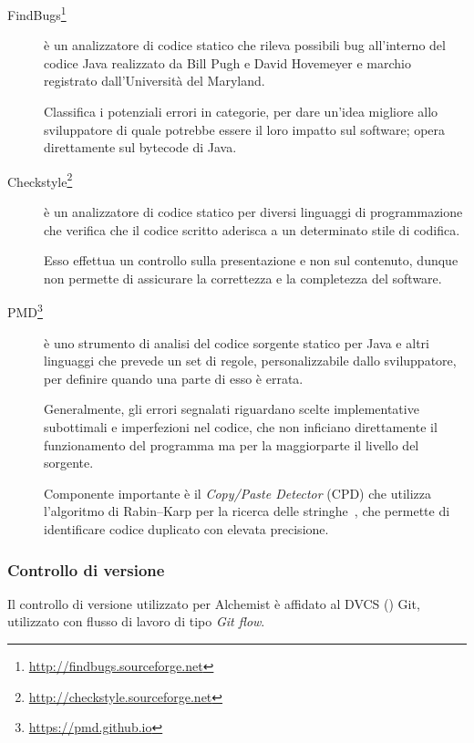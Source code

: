                 \begin{description}
                    \item[FindBugs\footnote{\url{http://findbugs.sourceforge.net}}] è un analizzatore di codice statico  che rileva possibili bug all’interno del codice Java realizzato da Bill Pugh e David Hovemeyer e marchio registrato dall'Università del Maryland.

                    Classifica i potenziali errori in categorie, per dare un'idea migliore allo sviluppatore di quale potrebbe essere il loro impatto sul software; opera direttamente sul bytecode di Java.

                    \item[Checkstyle\footnote{\url{http://checkstyle.sourceforge.net}}] è un analizzatore di codice statico  per diversi linguaggi di programmazione che verifica che il codice scritto aderisca a un determinato stile di codifica.

                    Esso effettua un controllo sulla presentazione e non sul contenuto, dunque non permette di assicurare la correttezza e la completezza del software.

                    \item[PMD\footnote{\url{https://pmd.github.io}}] è uno strumento di analisi del codice sorgente statico per Java e altri linguaggi che prevede un set di regole, personalizzabile dallo sviluppatore, per definire quando una parte di esso è errata.

                    Generalmente, gli errori segnalati riguardano scelte implementative subottimali e imperfezioni nel codice, che non inficiano direttamente il funzionamento del programma ma per la maggiorparte il livello del sorgente.

                    Componente importante è il \emph{Copy/Paste Detector} (CPD) che utilizza l'algoritmo di Rabin–Karp per la ricerca delle stringhe~\cite{RabinKarp}, che permette di identificare codice duplicato con elevata precisione.

                \end{description}

            \subsubsection{Controllo di versione}\label{subsub:hosting}
                Il controllo di versione utilizzato per Alchemist è affidato al DVCS () Git, utilizzato con flusso di lavoro di tipo \emph{Git flow}.

